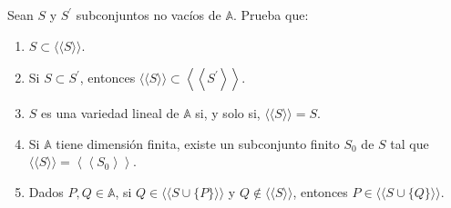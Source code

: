 \documentclass[12pt, a4paper, ones, notitlepage, openany,titlepage]{article}
\begin{document}
\noindent Sean $S$ y $S^{\prime}$ subconjuntos no vacíos de $\mathbb{A}$. Prueba que:
\begin{enumerate}[label=(\arabic*)]
\item $S \subset\langle\langle S\rangle\rangle$.

\item Si $S \subset S^{\prime}$, entonces $\langle\langle S\rangle\rangle \subset\left\langle\left\langle S^{\prime}\right\rangle\right\rangle$.

\item $S$ es una variedad lineal de $\mathbb{A}$ si, y solo si, $\langle\langle S\rangle\rangle=S$.

\item Si $\mathbb{A}$ tiene dimensión finita, existe un subconjunto finito $S_{0}$ de $S$ tal que $\langle\langle S\rangle\rangle=\left\langle\left\langle S_{0}\right\rangle\right\rangle$.

\item Dados $P, Q \in \mathbb{A}$, si $Q \in\langle\langle S \cup\{P\}\rangle\rangle$ y $Q \notin\langle\langle S\rangle\rangle$, entonces $P \in\langle\langle S \cup\{Q\}\rangle\rangle$.
\end{enumerate}
\end{document}
